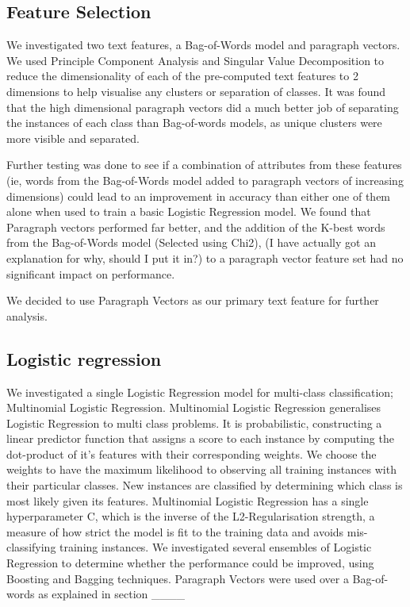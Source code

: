 \documentclass[11pt]{article}
\newcommand{\drafting}[1]{\textcolor{OliveGreen}{#1}}
\begin{document}
\subsection{Feature Selection} \label{subsec:method-features}

We investigated two text features, a Bag-of-Words model and paragraph vectors. We used Principle Component Analysis and Singular Value Decomposition to reduce the dimensionality of each of the pre-computed text features to 2 dimensions to help visualise any clusters or separation of classes. It was found that the high dimensional paragraph vectors did a much better job of separating the instances of each class than Bag-of-words models, as unique clusters were more visible and separated.

Further testing was done to see if a combination of attributes from these features (ie, words from the Bag-of-Words model added to paragraph vectors of increasing dimensions) could lead to an improvement in accuracy than either one of them alone when used to train a basic Logistic Regression model. We found that Paragraph vectors performed far better, and the addition of the K-best words from the Bag-of-Words model (Selected using Chi2), \drafting{(I have actually got an explanation for why, should I put it in?)} to a paragraph vector feature set had no significant impact on performance.

We decided to use Paragraph Vectors as our primary text feature for further analysis.
\subsection{Logistic regression} \label{subsec:method-lr}
\drafting{
We investigated a single Logistic Regression model for multi-class classification; Multinomial Logistic Regression. Multinomial Logistic Regression generalises Logistic Regression to multi class problems. It is probabilistic, constructing a linear predictor function that assigns a score to each instance by computing the dot-product of it's features with their corresponding weights. We choose the weights to have the maximum likelihood to observing all training instances with their particular classes. New instances are classified by determining which class is most likely given its features.
Multinomial Logistic Regression has a single hyperparameter C, which is the inverse of the L2-Regularisation strength, a measure of how strict the model is fit to the training data and avoids mis-classifying training instances.
We investigated several ensembles of Logistic Regression to determine whether the performance could be improved, using Boosting and Bagging techniques.
Paragraph Vectors were used over a Bag-of-words as explained in section ____}
\end{document}
